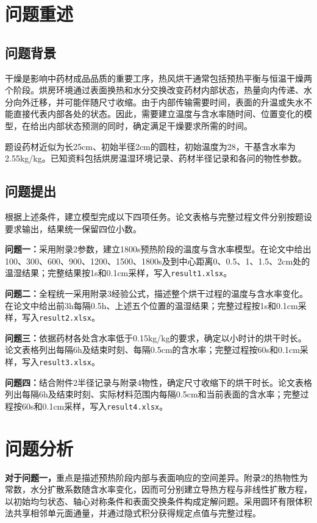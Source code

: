 \section{问题重述}
\subsection{问题背景}
干燥是影响中药材成品品质的重要工序，热风烘干通常包括预热平衡与恒温干燥两个阶段。烘房环境通过表面换热和水分交换改变药材内部状态，热量向内传递、水分向外迁移，并可能伴随尺寸收缩。由于内部传输需要时间，表面的升温或失水不能直接代表内部各处的状态。因此，需要建立温度与含水率随时间、位置变化的模型，在给出内部状态预测的同时，确定满足干燥要求所需的时间\cite{problem}。

题设药材近似为长25\unit{cm}、初始半径2\unit{cm}的圆柱，初始温度为28\celsius，干基含水率为2.55\unit{kg/kg}。已知资料包括烘房温湿环境记录、药材半径记录和各问的物性参数。

\subsection{问题提出}
根据上述条件，建立模型完成以下四项任务。论文表格与完整过程文件分别按题设要求输出，结果统一保留四位小数。

\textbf{问题一：}采用附录2参数，建立1800\unit{s}预热阶段的温度与含水率模型。在论文中给出100、300、600、900、1200、1500、1800\unit{s}及到中心距离0、0.5、1、1.5、2\unit{cm}处的温湿结果；完整结果按1\unit{s}和0.1\unit{cm}采样，写入\texttt{result1.xlsx}。

\textbf{问题二：}全程统一采用附录3经验公式，描述整个烘干过程的温度与含水率变化。在论文中给出前3\unit{h}每隔0.5\unit{h}、上述五个位置的温湿结果；完整过程按1\unit{s}和0.1\unit{cm}采样，写入\texttt{result2.xlsx}。

\textbf{问题三：}依据药材各处含水率低于0.15\unit{kg/kg}的要求，确定以小时计的烘干时长。论文表格列出每隔6\unit{h}及结束时刻、每隔0.5\unit{cm}的含水率；完整过程按60\unit{s}和0.1\unit{cm}采样，写入\texttt{result3.xlsx}。

\textbf{问题四：}结合附件2半径记录与附录4物性，确定尺寸收缩下的烘干时长。论文表格列出每隔6\unit{h}及结束时刻、实际材料范围内每隔0.5\unit{cm}和当前表面的含水率；完整过程按60\unit{s}和0.1\unit{cm}采样，写入\texttt{result4.xlsx}。

\section{问题分析}
\textbf{对于问题一，}重点是描述预热阶段内部与表面响应的空间差异。附录2的热物性为常数，水分扩散系数随含水率变化，因而可分别建立导热方程与非线性扩散方程，以初始均匀状态、轴心对称条件和表面交换条件构成定解问题。采用圆环有限体积法共享相邻单元面通量，并通过隐式积分获得规定点值与完整过程\cite{dasilva2014}。

